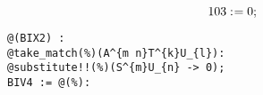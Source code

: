 \documentclass[11pt]{article}
\def\specialcolon{\mathrel{\mathop{:}}\hspace{-.5em}}
\begin{document}
\begin{dmath*}[compact, spread=2pt]
103\specialcolon{}= 0;
\end{dmath*}
{\color[named]{Blue}\begin{verbatim}
@(BIX2) :
@take_match(%)(A^{m n}T^{k}U_{l}):
@substitute!!(%)(S^{m}U_{n} -> 0);
BIV4 := @(%):
\end{verbatim}}
\end{document}
